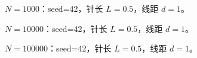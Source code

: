 $N=1000$：seed=42，针长 $L=0.5$，线距 $d=1$。

$N=10000$：seed=42，针长 $L=0.5$，线距 $d=1$。

$N=100000$：seed=42，针长 $L=0.5$，线距 $d=1$。
